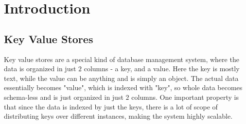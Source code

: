 \documentclass[11pt]{article}
\begin{document}
% 
% 




\pagebreak
\section*{Introduction}
\subsection*{Key Value Stores}
Key value stores are a special kind of database management system, where the 
data is organized in just $2$ columns - a key, and a value. Here the key is mostly
text, while the value can be anything and is simply an object. The actual data
essentially becomes "value", which is indexed with "key", so whole data 
becomes schema-less and is just organized in just $2$ columns. One important property
is that since the data is indexed by just the keys, there is a lot of scope of
distributing keys over different instances, making the system highly scalable.
\\
\end{document}
